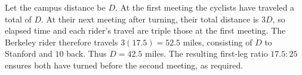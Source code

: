 Let the campus distance be $D$. At the first meeting the cyclists have traveled a total of $D$. At their next meeting after turning, their total distance is $3D$, so elapsed time and each rider's travel are triple those at the first meeting. The Berkeley rider therefore travels $3(17.5)=52.5$ miles, consisting of $D$ to Stanford and $10$ back. Thus $D=\boxed{42.5}$ miles. The resulting first-leg ratio $17.5:25$ ensures both have turned before the second meeting, as required.
